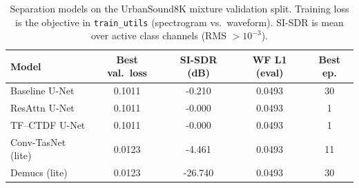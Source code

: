 \begin{table}[t]
\centering
\caption{Separation models on the UrbanSound8K mixture validation split. Training loss is the objective in \texttt{train\_utils} (spectrogram vs.\ waveform). SI-SDR is mean over active class channels (RMS $> 10^{-3}$).}
\label{tab:separation-benchmark}
\begin{tabular}{lcccc}
\toprule
Model & Best val.\ loss & SI-SDR (dB) & WF L1 (eval) & Best ep. \\
\midrule
Baseline U-Net & 0.1011 & -0.210 & 0.0493 & 30 \\
ResAttn U-Net & 0.1011 & -0.000 & 0.0493 & 1 \\
TF–CTDF U-Net & 0.1011 & -0.000 & 0.0493 & 1 \\
Conv-TasNet (lite) & 0.0123 & -4.461 & 0.0493 & 11 \\
Demucs (lite) & 0.0123 & -26.740 & 0.0493 & 30 \\
\bottomrule
\end{tabular}
\end{table}
